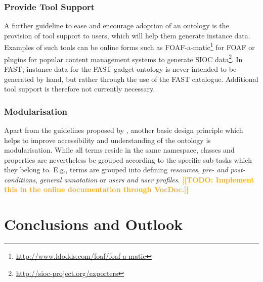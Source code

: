 \documentclass[twoside]{fast_latex}
\newcommand{\todo}[1]{\textsf{\textbf{\textcolor{Orange}{[[TODO: #1]]}}}}
\newcommand{\todo}[1]{}
\begin{document}
\subsubsection{Provide Tool Support} %
\label{ssub:provide_tool_support}

A further guideline to ease and encourage adoption of an ontology is the provision of tool support to users, which will help them generate instance data. Examples of such tools can be online forms such as FOAF-a-matic\footnote{\url{http://www.ldodds.com/foaf/foaf-a-matic}} for FOAF or plugins for popular content management systems to generate SIOC data\footnote{\url{http://sioc-project.org/exporters}}. In FAST, instance data for the FAST gadget ontology is never intended to be generated by hand, but rather through the use of the FAST catalogue. Additional tool support is therefore not currently necessary.


\subsubsection{Modularisation} %
\label{ssub:modularisation}

Apart from the guidelines proposed by \cite{moeller2009ontology_soft_skills}, another basic design principle which helps to improve accessibility and understanding of the ontology is modularisation. While all terms reside in the same namespace, classes and properties are nevertheless be grouped according to the specific sub-tasks which they belong to. E.g., terms are grouped into defining \emph{resources}, \emph{pre- and post-conditions}, \emph{general annotation} or \emph{users and user profiles}. \todo{Implement this in the online documentation through VocDoc.}



\section{Conclusions and Outlook} %
\label{sec:conclusions}
\end{document}
